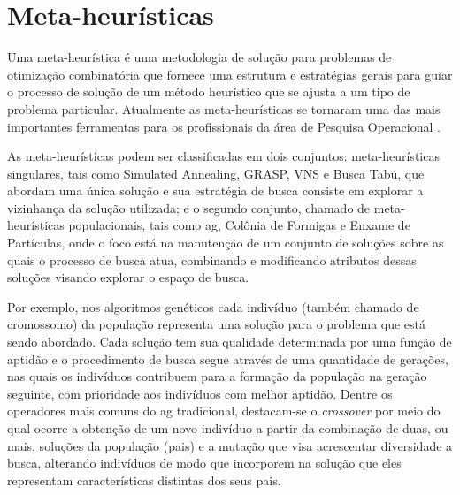 \section{Meta-heurísticas} \label{sec:metaheuristic}

Uma meta-heurística  é uma  metodologia de  solução para  problemas de
otimização combinatória que fornece uma estrutura e estratégias gerais
para guiar o processo de solução de um método heurístico que se ajusta
a um tipo  de problema particular.  Atualmente  as meta-heurísticas se
tornaram uma das mais importantes ferramentas para os profissionais da
área de Pesquisa Operacional \cite{hillier2013introduccao}.

As  meta-heurísticas  podem  ser   classificadas  em  dois  conjuntos:
meta-heurísticas singulares, tais como Simulated Annealing, GRASP, VNS
e Busca Tabú, que abordam uma  única solução e sua estratégia de busca
consiste em  explorar a vizinhança  da solução utilizada; e  o segundo
conjunto,  chamado   de  meta-heurísticas  populacionais,   tais  como
\gls{ag}, Colônia de Formigas e Enxame de Partículas, onde o foco está
na manutenção de um conjunto de  soluções sobre as quais o processo de
busca atua, combinando e modificando atributos dessas soluções visando
explorar o espaço de busca.

Por exemplo,  nos algoritmos genéticos cada  indivíduo (também chamado
de cromossomo) da população representa uma solução para o problema que
está sendo  abordado. Cada solução  tem sua qualidade  determinada por
uma função de  aptidão e o procedimento de busca  segue através de uma
quantidade  de gerações,  nas quais  os indivíduos  contribuem para  a
formação  da  população  na   geração  seguinte,  com  prioridade  aos
indivíduos com  melhor aptidão.  Dentre  os operadores mais  comuns do
\gls{ag}  tradicional, destacam-se  o \textit{crossover}  por meio  do
qual ocorre a obtenção de um  novo indivíduo a partir da combinação de
duas,  ou mais,  soluções da  população (pais)  e a  mutação que  visa
acrescentar  diversidade a  busca,  alterando indivíduos  de modo  que
incorporem na  solução que eles representam  características distintas
dos seus pais.

\begin{comment}
\subsection{Multiplicadores de Lagrange e Método de Pontos Interiores}

Estou com dificuldade nessa Seção, a leitura é meio densa e não consigo entender com firmeza a associação. A referência que estou utilizando é o livro de Vanderbei \cite{vanderbei:2015}.
\end{comment}

